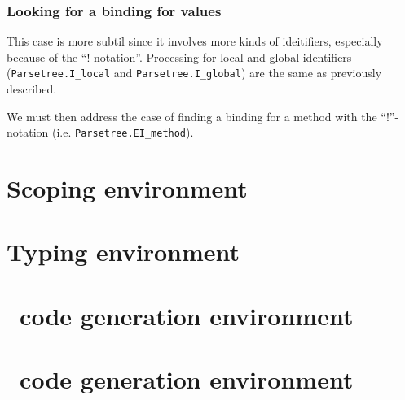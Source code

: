 \subsubsection{Looking for a binding for values}
This case is more subtil since it involves more kinds of ideitifiers,
especially because of the ``!-notation''. Processing for local and
global identifiers ({\tt Parsetree.I\_local} and {\tt Parsetree.I\_global})
are the same as previously described.

We must then address the case of finding a binding for a method with
the ``!''-notation (i.e. {\tt Parsetree.EI\_method}).


\section{Scoping environment}

\section{Typing environment}

\section{\ocaml\ code generation environment}

\section{\coq\ code generation environment}
